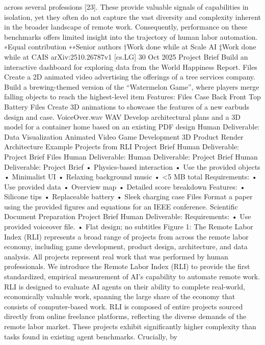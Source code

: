 across several professions [23]. These provide valuable signals of capabilities in isolation, yet they
often do not capture the vast diversity and complexity inherent in the broader landscape of remote
work. Consequently, performance on these benchmarks offers limited insight into the trajectory of
human labor automation.
∗Equal contribution
∗∗Senior authors
†Work done while at Scale AI
‡Work done while at CAIS
arXiv:2510.26787v1  [cs.LG]  30 Oct 2025
Project Brief
Build an interactive dashboard
for exploring data from the
World  Happiness Report.
Files
Create a 2D animated video
advertising the offerings of a
tree services company.
Build a brewing-themed
version of the “Watermelon
Game”, where players merge
falling objects to reach the
highest-level item
Features:
Files
Case
Back
Front
Top
Battery
Files
Create 3D animations to
showcase the features of a
new earbuds design and case.
VoiceOver.wav
WAV
Develop architectural plans and a
3D model for a container home
based on an existing PDF design
Human Deliverable:
Data Visualization
Animated Video
Game Development
3D Product Render
Architecture
Example Projects from RLI
Project Brief
Human Deliverable:
Project Brief
Files
Human Deliverable:
Human Deliverable:
Project Brief
Human Deliverable:
Project Brief
• Physics-based interaction
• Use the provided objects
• Minimalist UI
• Relaxing background music
• <5 MB total
Requirements:
   • Use provided data
   • Overview map
   • Detailed score breakdown
Features:
   • Silicone tips
   • Replaceable battery
   • Sleek charging case
Files
Format a paper using the provided
figures and equations for an IEEE
conference.
Scientific Document Preparation
Project Brief
Human Deliverable:
Requirements:
   • Use provided voiceover file.
   • Flat design; no subtitles
Figure 1: The Remote Labor Index (RLI) represents a broad range of projects from across the remote
labor economy, including game development, product design, architecture, and data analysis. All
projects represent real work that was performed by human professionals.
We introduce the Remote Labor Index (RLI) to provide the first standardized, empirical measurement
of AI’s capability to automate remote work. RLI is designed to evaluate AI agents on their ability
to complete real-world, economically valuable work, spanning the large share of the economy that
consists of computer-based work. RLI is composed of entire projects sourced directly from online
freelance platforms, reflecting the diverse demands of the remote labor market. These projects
exhibit significantly higher complexity than tasks found in existing agent benchmarks. Crucially, by
